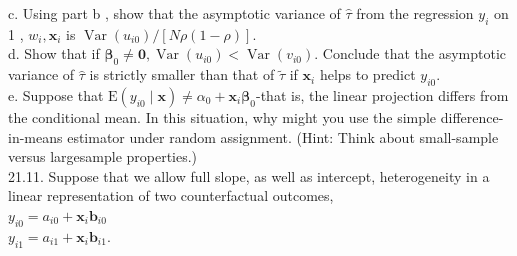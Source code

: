 \documentclass[10pt]{article}
\begin{document}
c. Using part b , show that the asymptotic variance of $\hat{\tau}$ from the regression $y_{i}$ on 1 , $w_{i}, \mathbf{x}_{i}$ is $\operatorname{Var}\left(u_{i 0}\right) /[N \rho(1-\rho)]$.\\
d. Show that if $\boldsymbol{\beta}_{0} \neq \mathbf{0}, \operatorname{Var}\left(u_{i 0}\right)<\operatorname{Var}\left(v_{i 0}\right)$. Conclude that the asymptotic variance of $\hat{\tau}$ is strictly smaller than that of $\tilde{\tau}$ if $\mathbf{x}_{i}$ helps to predict $y_{i 0}$.\\
e. Suppose that $\mathrm{E}\left(y_{i 0} \mid \mathbf{x}\right) \neq \alpha_{0}+\mathbf{x}_{i} \boldsymbol{\beta}_{0}$-that is, the linear projection differs from the conditional mean. In this situation, why might you use the simple difference-in-means estimator under random assignment. (Hint: Think about small-sample versus largesample properties.)\\
21.11. Suppose that we allow full slope, as well as intercept, heterogeneity in a linear representation of two counterfactual outcomes,\\
$y_{i 0}=a_{i 0}+\mathbf{x}_{i} \mathbf{b}_{i 0}$\\
$y_{i 1}=a_{i 1}+\mathbf{x}_{i} \mathbf{b}_{i 1}$.
\end{document}
